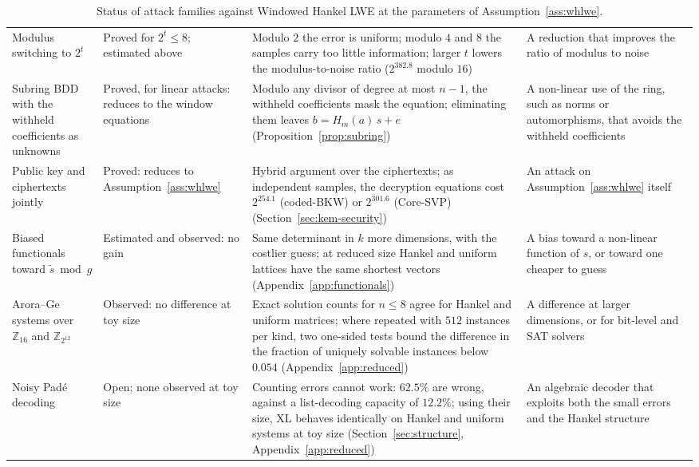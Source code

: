 \documentclass[11pt,a4paper]{article}
\theoremstyle{definition}
\newcommand{\Z}{\mathbb{Z}}
\begin{document}
\begin{table}[p]
\begin{tabularx}{\textwidth}{@{}>{\raggedright\arraybackslash}p{2.55cm} >{\raggedright\arraybackslash}p{1.9cm} >{\raggedright\arraybackslash}X >{\raggedright\arraybackslash}X@{}}
Modulus switching to $2^t$ & Proved for $2^t \le 8$; estimated above & Modulo $2$ the error is uniform; modulo $4$ and $8$ the samples carry too little information; larger $t$ lowers the modulus-to-noise ratio ($2^{382.8}$ modulo $16$) & A reduction that improves the ratio of modulus to noise \\
Subring BDD with the withheld coefficients as unknowns & Proved, for linear attacks: reduces to the window equations & Modulo any divisor of degree at most $n - 1$, the withheld coefficients mask the equation; eliminating them leaves $b = H_m(a)\,s + e$ (Proposition~\ref{prop:subring}) & A non-linear use of the ring, such as norms or automorphisms, that avoids the withheld coefficients \\
Public key and ciphertexts jointly & Proved: reduces to Assumption~\ref{ass:whlwe} & Hybrid argument over the ciphertexts; as independent samples, the decryption equations cost $2^{254.1}$ (coded-BKW) or $2^{301.6}$ (Core-SVP) (Section~\ref{sec:kem-security}) & An attack on Assumption~\ref{ass:whlwe} itself \\
Biased functionals toward $\tilde{s} \bmod g$ & Estimated and observed: no gain & Same determinant in $k$ more dimensions, with the costlier guess; at reduced size Hankel and uniform lattices have the same shortest vectors (Appendix~\ref{app:functionals}) & A bias toward a non-linear function of $s$, or toward one cheaper to guess \\
Arora--Ge systems over $\Z_{16}$ and $\Z_{2^{12}}$ & Observed: no difference at toy size & Exact solution counts for $n \le 8$ agree for Hankel and uniform matrices; where repeated with $512$ instances per kind, two one-sided tests bound the difference in the fraction of uniquely solvable instances below $0.054$ (Appendix~\ref{app:reduced}) & A difference at larger dimensions, or for bit-level and SAT solvers \\
\midrule
Noisy Pad\'e decoding & Open; none observed at toy size & Counting errors cannot work: $62.5\%$ are wrong, against a list-decoding capacity of $12.2\%$; using their size, XL behaves identically on Hankel and uniform systems at toy size (Section~\ref{sec:structure}, Appendix~\ref{app:reduced}) & An algebraic decoder that exploits both the small errors and the Hankel structure \\
\bottomrule
\end{tabularx}
\caption{Status of attack families against Windowed Hankel LWE at the parameters of Assumption~\ref{ass:whlwe}.}
\label{tab:checklist}
\end{table}
\end{document}
